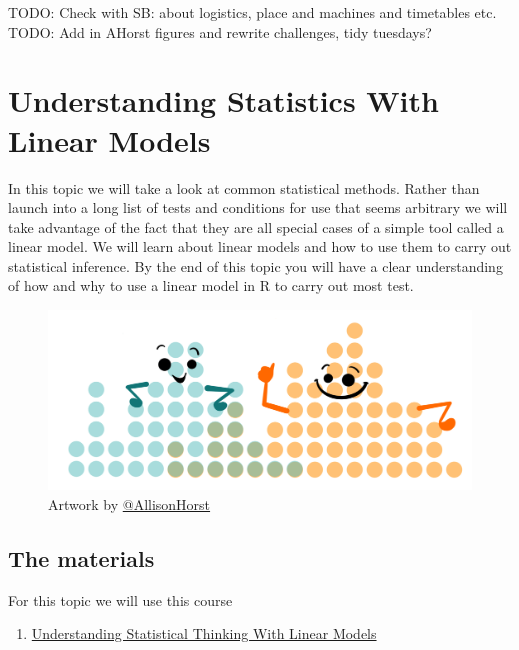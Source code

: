 \documentclass[
]{book}
\providecommand{\tightlist}{%
  \setlength{\itemsep}{0pt}\setlength{\parskip}{0pt}}
\begin{document}
TODO: Check with SB: about logistics, place and machines and timetables etc.
TODO: Add in AHorst figures and rewrite challenges, tidy tuesdays?

\hypertarget{understanding-statistics-with-linear-models}{%
\chapter{Understanding Statistics With Linear Models}\label{understanding-statistics-with-linear-models}}

In this topic we will take a look at common statistical methods. Rather than launch into a long list of tests and conditions for use that seems arbitrary we will take advantage of the fact that they are all special cases of a simple tool called a linear model. We will learn about linear models and how to use them to carry out statistical inference. By the end of this topic you will have a clear understanding of how and why to use a linear model in R to carry out most test.

\begin{figure}
\centering
\includegraphics{ex_4.png}
\caption{\label{fig:unnamed-chunk-4}Artwork by \href{https://github.com/allisonhorst}{@AllisonHorst}}
\end{figure}

\hypertarget{the-materials-2}{%
\section{The materials}\label{the-materials-2}}

For this topic we will use this course

\begin{enumerate}
\def\labelenumi{\arabic{enumi}.}
\tightlist
\item
  \href{https://danmaclean.github.io/intro_to_stats/}{Understanding Statistical Thinking With Linear Models}
\end{enumerate}
\end{document}
